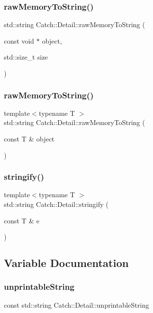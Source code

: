 \mbox{\label{namespace_catch_1_1_detail_ac5d6c510e565ee5bddcc2236194ce29e}} 
\subsubsection{rawMemoryToString()\hspace{0.1cm}{\footnotesize\ttfamily [1/2]}}
{\footnotesize\ttfamily std\+::string Catch\+::\+Detail\+::raw\+Memory\+To\+String (\begin{DoxyParamCaption}\item[{const void $\ast$}]{object,  }\item[{std\+::size\+\_\+t}]{size }\end{DoxyParamCaption})}

\mbox{\label{namespace_catch_1_1_detail_a371620ed524abfcae5c3772bf49b563a}} 
\subsubsection{rawMemoryToString()\hspace{0.1cm}{\footnotesize\ttfamily [2/2]}}
{\footnotesize\ttfamily template$<$typename T $>$ \\
std\+::string Catch\+::\+Detail\+::raw\+Memory\+To\+String (\begin{DoxyParamCaption}\item[{const T \&}]{object }\end{DoxyParamCaption})}

\mbox{\label{namespace_catch_1_1_detail_af0ad48344ffd3f92f3568465248a9880}} 
\subsubsection{stringify()}
{\footnotesize\ttfamily template$<$typename T $>$ \\
std\+::string Catch\+::\+Detail\+::stringify (\begin{DoxyParamCaption}\item[{const T \&}]{e }\end{DoxyParamCaption})}



\subsection{Variable Documentation}
\mbox{\label{namespace_catch_1_1_detail_a466775f4eec29ffef29ab334cd885136}} 
\subsubsection{unprintableString}
{\footnotesize\ttfamily const std\+::string Catch\+::\+Detail\+::unprintable\+String}

